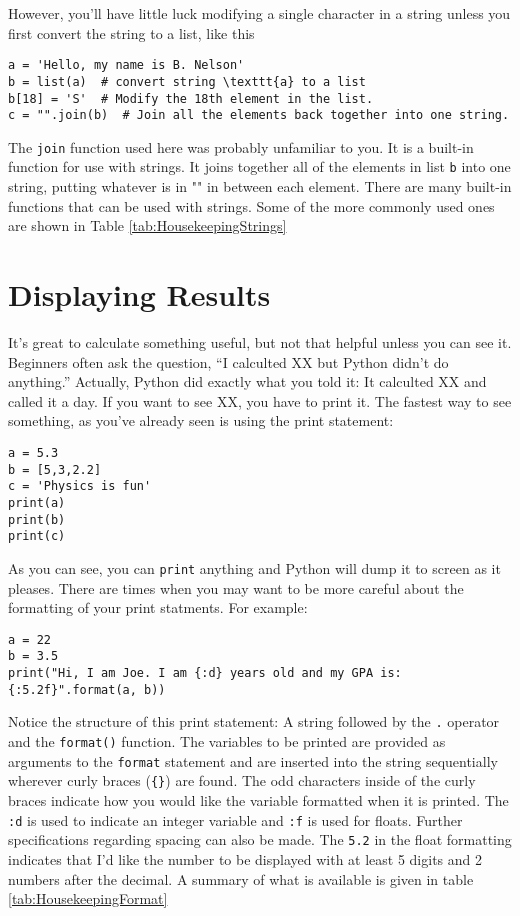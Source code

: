  However, you'll have little luck modifying a single character in a
string unless you first convert the string to a list, like this
\begin{Verbatim}
a = 'Hello, my name is B. Nelson'
b = list(a)  # convert string \texttt{a} to a list
b[18] = 'S'  # Modify the 18th element in the list.
c = "".join(b)  # Join all the elements back together into one string.
\end{Verbatim}
The \texttt{join} function used here was probably unfamiliar to you.
It is a built-in function for use with strings.  It joins together all
of the elements in list \texttt{b} into one string, putting whatever
is in "" in between
each element.  There are many built-in functions that can be used with
strings.  Some of the more commonly used ones are shown in Table \ref{tab:HousekeepingStrings}
\section{Displaying Results}
It's great to calculate something useful, but not that helpful unless
you can see it.  Beginners often ask the question, ``I calculted XX
but Python didn't do anything.''  Actually, Python did exactly what
you told it:  It calculted XX and called it a day.  If you want to see
XX, you have to print it.   The fastest way to see something, as
you've already seen is using the print statement:
\begin{Verbatim}
a = 5.3
b = [5,3,2.2]
c = 'Physics is fun'
print(a)
print(b)
print(c)
\end{Verbatim}
As you can see, you can \texttt{print} anything and Python will dump
it to screen as it pleases.  There are times when you may want to be
more careful about the formatting of your print statments.  For
example:
\begin{Verbatim}
a = 22
b = 3.5
print("Hi, I am Joe. I am {:d} years old and my GPA is: {:5.2f}".format(a, b))
\end{Verbatim}
Notice the structure of this print statement: A string followed by the
\texttt{.} operator and the \texttt{format()} function. The variables to
be printed are provided as arguments to the \texttt{format} statement
and are inserted into the string sequentially wherever curly braces
(\texttt{\{\}}) are found.
 The odd characters inside of the curly braces indicate how you would
 like the variable formatted when it is printed. The \texttt{:d} is
 used to indicate an integer variable and \texttt{:f} is used for
 floats.  Further specifications regarding spacing can also be made.
 The \texttt{5.2} in the float formatting indicates that I'd like the
 number to be displayed with at least 5 digits and 2 numbers after the
 decimal.  A
 summary of what is available is given in table \ref{tab:HousekeepingFormat}

